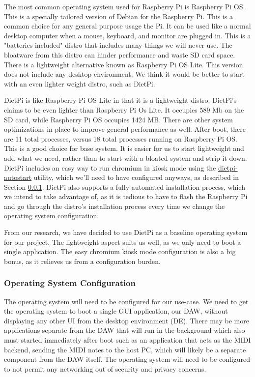 The most common operating system used for Raspberry Pi is Raspberry Pi OS. This is a
specially tailored version of Debian for the Raspberry Pi. This is a common choice for any
general purpose usage the Pi. It can be used like a normal desktop computer when a mouse,
keyboard, and monitor are plugged in. This is a "batteries included" distro that includes
many things we will never use. The bloatware from this distro can hinder performance and
waste SD card space. There is a lightweight alternative known as Raspberry Pi OS Lite.
This version does not include any desktop environment. We think it would be better to
start with an even lighter weight distro, such as DietPi.

DietPi is like Raspberry Pi OS Lite in that it is a lightweight distro. DietPi's claims to
be even lighter than Raspberry Pi Os Lite. It occupies 589 Mb on the SD card, while
Raspberry Pi OS occupies 1424 MB. There are other system optimizations in place to improve
general performance as well. After boot, there are 11 total processes, versus 18 total
processes running on Raspberry Pi OS. This is a good choice for base system. It is easier
for us to start lightweight and add what we need, rather than to start with a bloated
system and strip it down. DietPi includes an easy way to run chromium in kiosk mode using
the \url{dietpi-autostart} utility, which we'll need to have configured anyways, as
described in Section \ref{sec:research:subsec:os_config}. DietPi also supports a fully
automated installation process, which we intend to take advantage of, as it is tedious to
have to flash the Raspberry Pi and go through the distro's installation process every time
we change the operating system configuration.

From our research, we have decided to use DietPi as a baseline operating system for our
project. The lightweight aspect suits us well, as we only need to boot a single
application. The easy chromium kiosk mode configuration is also a big bonus, as it
relieves us from a configuration burden.

\subsubsection{Operating System Configuration}
\label{sec:research:subsec:os_config}

The operating system will need to be configured for our use-case. We need to get the
operating system to boot a single GUI application, our DAW, without displaying any other
UI from the desktop environment (DE). There may be more applications separate from the DAW
that will run in the background which also must started immediately after boot such as an
application that acts as the MIDI backend, sending the MIDI notes to the host PC, which
will likely be a separate component from the DAW itself. The operating system will need to
be configured to not permit any networking out of security and privacy concerns.

